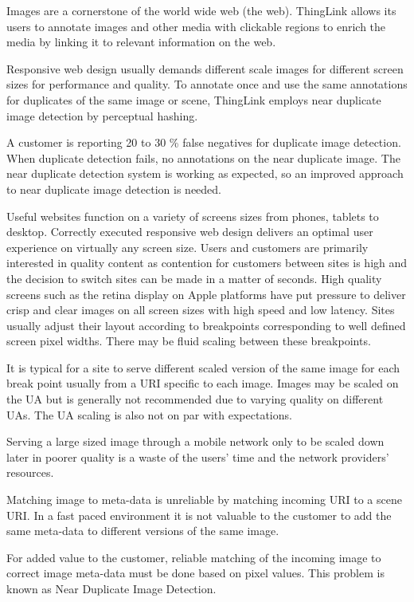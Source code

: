 \documentclass[english,12pt,a4paper,pdftex,elec,utf8]{aaltothesis}
\begin{document}
\thispagestyle{empty}

Images are a cornerstone of the world wide web (the web). ThingLink allows its users to annotate images and other media with clickable regions to enrich the media by linking it to relevant information on the web.

Responsive web design usually demands different scale images for different screen sizes for performance and quality. To annotate once and use the same annotations for duplicates of the same image or scene, ThingLink employs near duplicate image detection by perceptual hashing.

A customer is reporting 20 to 30 \% false negatives for duplicate image detection. When duplicate detection fails,  no annotations on the near duplicate image. The near duplicate detection system is working as expected, so an improved approach to near duplicate image detection is needed.

Useful websites function on a variety of screens sizes from phones, tablets to desktop. Correctly executed responsive web design delivers an optimal user experience on virtually any screen size. Users and customers are primarily interested in quality content as contention for customers between sites is high and the decision to switch sites can be made in a matter of seconds. High quality screens such as the retina display on Apple platforms have put pressure to deliver crisp and clear images on all screen sizes with high speed and low latency. Sites usually adjust their layout according to breakpoints corresponding to well defined screen pixel widths. There may be fluid scaling between these breakpoints.

It is typical for a site to serve different scaled version of the same image for each break point usually from a URI specific to each image. Images may be scaled on the UA but is generally not recommended due to varying quality on different UAs. The UA scaling is also not on par with expectations.

Serving a large sized image through a mobile network only to be scaled down later in poorer quality is a waste of the users' time and the network providers' resources.

Matching image to meta-data is unreliable by matching incoming URI to a scene URI. In a fast paced environment it is not valuable to the customer to add the same meta-data to different versions of the same image.

For added value to the customer, reliable matching of the incoming image to correct image meta-data must be done based on pixel values. This problem is known as Near Duplicate Image Detection.
\end{document}
